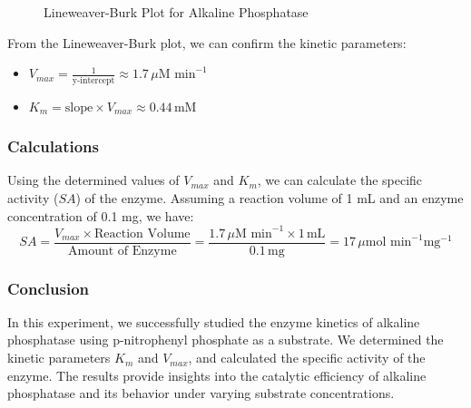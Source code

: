 \documentclass[openany]{book}
\begin{document}
\begin{figure}[H]
    \centering
    \caption{Lineweaver-Burk Plot for Alkaline Phosphatase}
    \label{fig:lineweaver_burk}
\end{figure}
From the Lineweaver-Burk plot, we can confirm the kinetic parameters:
\begin{itemize}
    \item $V_{max} = \frac{1}{\text{y-intercept}} \approx 1.7 \, \mu \text{M min}^{-1}$
    \item $K_m = \text{slope} \times V_{max} \approx 0.44 \, \text{mM}$
\end{itemize}

\subsubsection{Calculations}
Using the determined values of $V_{max}$ and $K_m$, we can calculate the specific activity ($SA$) of the enzyme. Assuming a reaction volume of 1 mL and an enzyme concentration of 0.1 mg, we have:
$$SA = \frac{V_{max} \times \text{Reaction Volume}}{\text{Amount of Enzyme}} = \frac{1.7 \, \mu \text{M min}^{-1} \times 1 \, \text{mL}}{0.1 \, \text{mg}} = 17 \, \mu \text{mol min}^{-1} \text{mg}^{-1}$$
\subsubsection{Conclusion}
In this experiment, we successfully studied the enzyme kinetics of alkaline phosphatase using p-nitrophenyl phosphate as a substrate. We determined the kinetic parameters $K_m$ and $V_{max}$, and calculated the specific activity of the enzyme. The results provide insights into the catalytic efficiency of alkaline phosphatase and its behavior under varying substrate concentrations.
\end{document}
